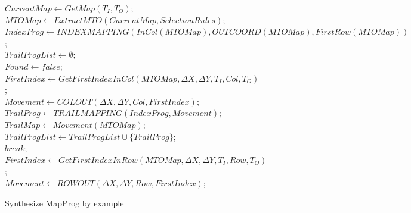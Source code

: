 \documentclass[design, pageheader]{njubachelor}
\begin{document}
\begin{figure}[!htbp]
    \begin{ttmath}
    \begin{algorithm*}[H]
    \caption{Synthesize MapProg by example}
    \SetAlgoLined
        $CurrentMap \leftarrow GetMap(T_{I}, T_{O})$;\\
        {
            $MTOMap \leftarrow ExtractMTO(CurrentMap, SelectionRules)$;\\
            $IndexProg \leftarrow INDEXMAPPING(InCol(MTOMap), OUTCOORD(MTOMap), FirstRow(MTOMap))$;\\
            $TrailProgList \leftarrow \emptyset$;\\
            {
                $Found \leftarrow false$;\\
                {
                    $FirstIndex \leftarrow GetFirstIndexInCol(MTOMap, \Delta X, \Delta Y, T_{I}, Col, T_{O})$;\\
                    $Movement \leftarrow COLOUT(\Delta X, \Delta Y, Col, FirstIndex)$;\\
                    $TrailProg \leftarrow TRAILMAPPING(IndexProg, Movement)$;\\
                    $TrailMap \leftarrow Movement(MTOMap)$;\\
                    {
                        $TrailProgList \leftarrow TrailProgList \cup \{TrailProg\}$;\\
                    }
                }
                {
                    $break$;\\
                }
                {
                    $FirstIndex \leftarrow GetFirstIndexInRow(MTOMap, \Delta X, \Delta Y, T_{I}, Row, T_{O})$;\\
                    $Movement \leftarrow ROWOUT(\Delta X, \Delta Y, Row, FirstIndex)$;\\
}}}
\end{algorithm*}
\end{ttmath}
\end{figure}
\end{document}
